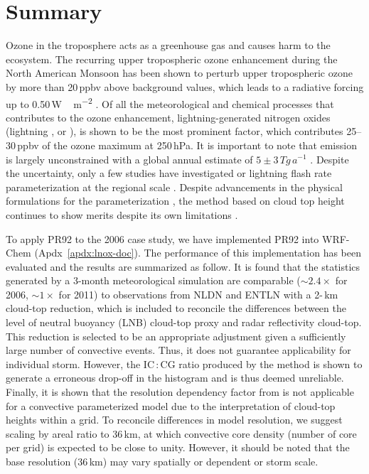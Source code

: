 \chapter{Summary} \label{ch:summary}

\ifpdf
    \graphicspath{{5_summary/figures/PNG/}{5_summary/figures/PDF/}{5_summary/figures/}}
\else
    \graphicspath{{5_summary/figures/EPS/}{5_summary/figures/}}
\fi

Ozone in the troposphere acts as a greenhouse gas and causes harm to the ecosystem.
The recurring upper tropospheric ozone enhancement during the North American Monsoon has
been shown to perturb upper tropospheric ozone by more than 20\,\unit{ppbv} above background values,
which leads to a radiative forcing up to 0.50\,\unit{W\,m^{-2}} \citep{Li:2005ss,Cooper:2007cr,Choi:2009bh}.
Of all the meteorological and chemical processes that contributes to the ozone enhancement,
lightning-generated nitrogen oxides (lightning , or {\lnox}), is shown to be the most
prominent factor, which contributes 25--30\,\unit{ppbv} of the ozone maximum at
250\,\unit{hPa}\citep{Cooper:2007cr}. It is important to note that {\lnox} emission is largely unconstrained
with a global annual estimate of $5\pm3\,\unit{Tg\,a^{-1}}$ \citep{Schumann:2007fk}. Despite the
uncertainty, only a few studies have investigated {\lnox} or lightning flash rate parameterization at the regional scale
\citep[e.g.][]{Allen:2010fk,Allen:2012fk,Barth:2012qf,Wong:2013vn}. Despite advancements in the
physical formulations for the parameterization \citep[][and references therein]{Barthe:2010uq},
the \citet[PR92;][]{Price:1992wb} method based on cloud top height continues to show
merits despite its own limitations \citep{Boccippio:2002uq}.

To apply PR92 to the 2006 case study, we have implemented PR92 into WRF-Chem
(Apdx~\ref{apdx:lnox-doc}). The performance of this implementation has been evaluated
\citep[][and Ch.~\ref{ch:lightning}]{Wong:2013vn} and the results are summarized as follow. It is
found that the statistics generated by a 3-month meteorological simulation are
comparable ($\sim2.4\times$ for 2006, $\sim1\times$ for 2011) to observations from NLDN and
ENTLN with a 2-\,\unit{km} cloud-top reduction, which is included to reconcile the differences between the level
of neutral buoyancy (LNB) cloud-top proxy and radar reflectivity cloud-top. This reduction is selected
to be an appropriate adjustment given a sufficiently large number of convective events. Thus, it
does not guarantee applicability for individual storm. However, the
IC\,:\,CG ratio produced by the \citet[][PR93]{Price:1993fk} method is shown to generate a erroneous
drop-off in the histogram and is thus deemed unreliable. Finally, it is shown that the resolution
dependency factor from \citet[][PR94]{Price:1994fk} is not applicable for a convective parameterized
model due to the interpretation of cloud-top heights within a grid. To reconcile differences
in model resolution, we suggest scaling by areal ratio to 36\,\unit{km}, at which convective
core density (number of core per grid) is expected to be close to unity. However, it should be noted
that the base resolution (36\,\unit{km}) may vary spatially or dependent or storm scale.

